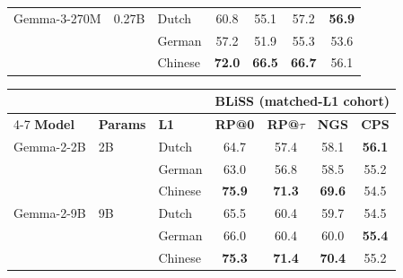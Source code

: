 \begin{table}[t]
\begin{minipage}[t]{0.49\linewidth}
\begin{tabular}{ll l cccc}
\addlinespace[2pt]
Gemma-3-270M & 0.27B & Dutch & \cellcolor[rgb]{0.887,1.000,0.887} 60.8 & \cellcolor[rgb]{0.936,1.000,0.936} 55.1 & \cellcolor[rgb]{0.905,1.000,0.905} 57.2 & \cellcolor[rgb]{0.859,1.000,0.859} \textbf{56.9} \\
 &  & German & \cellcolor[rgb]{0.925,1.000,0.925} 57.2 & \cellcolor[rgb]{0.976,1.000,0.976} 51.9 & \cellcolor[rgb]{0.930,1.000,0.930} 55.3 & \cellcolor[rgb]{0.926,1.000,0.926} 53.6 \\
 &  & Chinese & \cellcolor[rgb]{0.771,1.000,0.771} \textbf{72.0} & \cellcolor[rgb]{0.792,1.000,0.792} \textbf{66.5} & \cellcolor[rgb]{0.779,1.000,0.779} \textbf{66.7} & \cellcolor[rgb]{0.875,1.000,0.875} 56.1 \\
\bottomrule
\end{tabular}
\end{minipage}\hfill
\begin{minipage}[t]{0.49\linewidth}\centering
\begin{tabular}{ll l cccc}
\toprule
& & & \multicolumn{4}{c}{\textbf{BLiSS (matched-L1 cohort)}} \\
\cmidrule(lr){4-7}
\textbf{Model} & \textbf{Params} & \textbf{L1} & \textbf{RP@0} & \textbf{RP@$\tau$} & \textbf{NGS} & \textbf{CPS} \\
\midrule
Gemma-2-2B & 2B & Dutch & \cellcolor[rgb]{0.847,1.000,0.847} 64.7 & \cellcolor[rgb]{0.907,1.000,0.907} 57.4 & \cellcolor[rgb]{0.893,1.000,0.893} 58.1 & \cellcolor[rgb]{0.875,1.000,0.875} \textbf{56.1} \\
 &  & German & \cellcolor[rgb]{0.864,1.000,0.864} 63.0 & \cellcolor[rgb]{0.914,1.000,0.914} 56.8 & \cellcolor[rgb]{0.887,1.000,0.887} 58.5 & \cellcolor[rgb]{0.894,1.000,0.894} 55.2 \\
 &  & Chinese & \cellcolor[rgb]{0.730,1.000,0.730} \textbf{75.9} & \cellcolor[rgb]{0.731,1.000,0.731} \textbf{71.3} & \cellcolor[rgb]{0.741,1.000,0.741} \textbf{69.6} & \cellcolor[rgb]{0.908,1.000,0.908} 54.5 \\
\addlinespace[2pt]
Gemma-2-9B & 9B & Dutch & \cellcolor[rgb]{0.838,1.000,0.838} 65.5 & \cellcolor[rgb]{0.869,1.000,0.869} 60.4 & \cellcolor[rgb]{0.872,1.000,0.872} 59.7 & \cellcolor[rgb]{0.908,1.000,0.908} 54.5 \\
 &  & German & \cellcolor[rgb]{0.833,1.000,0.833} 66.0 & \cellcolor[rgb]{0.869,1.000,0.869} 60.4 & \cellcolor[rgb]{0.868,1.000,0.868} 60.0 & \cellcolor[rgb]{0.890,1.000,0.890} \textbf{55.4} \\
 &  & Chinese & \cellcolor[rgb]{0.736,1.000,0.736} \textbf{75.3} & \cellcolor[rgb]{0.730,1.000,0.730} \textbf{71.4} & \cellcolor[rgb]{0.730,1.000,0.730} \textbf{70.4} & \cellcolor[rgb]{0.894,1.000,0.894} 55.2 \\

\end{tabular}
\end{minipage}
\end{table}
